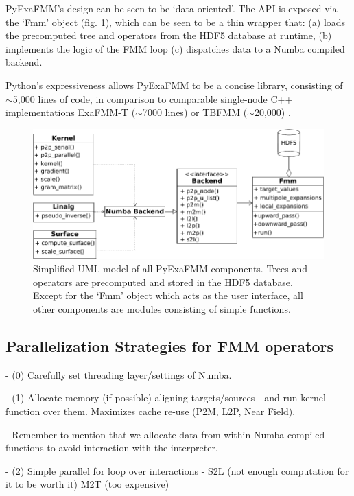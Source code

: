 \documentclass{IEEEcsmag}
\begin{document}
PyExaFMM's design can be seen to be `data oriented'. The API is exposed via the `Fmm' object (fig. \ref{fig:design}), which can be seen to be a thin wrapper that: (a) loads the precomputed tree and operators from the HDF5 database at runtime, (b) implements the logic of the FMM loop (c) dispatches data to a Numba compiled backend.

Python's expressiveness allows PyExaFMM to be a concise library, consisting of $\sim$5,000 lines of code, in comparison to comparable single-node C++ implementations ExaFMM-T ($\sim$7000 lines) \cite{Wang2021} or TBFMM ($\sim$20,000) \cite{Bramas2020}.

\begin{figure}
	\centerline{\includegraphics {figures/software.pdf}}
	\caption{Simplified UML model of all PyExaFMM components. Trees and operators are precomputed and stored in the HDF5 database. Except for the `Fmm' object which acts as the user interface, all other components are modules consisting of simple functions.}
	\label{fig:design}
\end{figure}

\subsection{Parallelization Strategies for FMM operators}


- (0) Carefully set threading layer/settings of Numba.

- (1) Allocate memory (if possible) aligning targets/sources - and run kernel function over them. Maximizes cache re-use (P2M, L2P, Near Field).

- Remember to mention that we allocate data from within Numba compiled functions to avoid interaction with the interpreter.

- (2) Simple parallel for loop over interactions - S2L (not enough computation for it to be worth it) M2T (too expensive)
\end{document}
